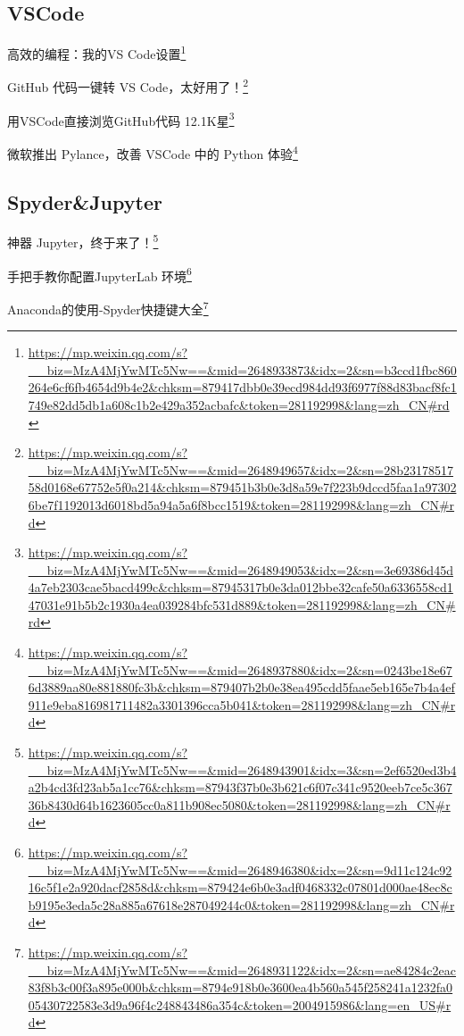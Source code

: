 \documentclass[]{ctexbook}
\renewcommand{\href}[2]{#2\footnote{\url{#1}}}
\begin{document}
\hypertarget{vscode}{%
\subsection{VSCode}\label{vscode}}

\href{https://mp.weixin.qq.com/s?__biz=MzA4MjYwMTc5Nw==\&mid=2648933873\&idx=2\&sn=b3ccd1fbc860264e6cf6fb4654d9b4e2\&chksm=879417dbb0e39ecd984dd93f6977f88d83bacf8fc1749e82dd5db1a608c1b2e429a352acbafc\&token=281192998\&lang=zh_CN\#rd}{高效的编程：我的VS Code设置}

\href{https://mp.weixin.qq.com/s?__biz=MzA4MjYwMTc5Nw==\&mid=2648949657\&idx=2\&sn=28b2317851758d0168e67752e5f0a214\&chksm=879451b3b0e3d8a59e7f223b9dccd5faa1a973026be7f1192013d6018bd5a94a5a6f8bcc1519\&token=281192998\&lang=zh_CN\#rd}{GitHub 代码一键转 VS Code，太好用了！}

\href{https://mp.weixin.qq.com/s?__biz=MzA4MjYwMTc5Nw==\&mid=2648949053\&idx=2\&sn=3e69386d45d4a7eb2303cae5bacd499c\&chksm=87945317b0e3da012bbe32cafe50a6336558cd147031e91b5b2c1930a4ea039284bfc531d889\&token=281192998\&lang=zh_CN\#rd}{用VSCode直接浏览GitHub代码 \textbar{} 12.1K星}

\href{https://mp.weixin.qq.com/s?__biz=MzA4MjYwMTc5Nw==\&mid=2648937880\&idx=2\&sn=0243be18e676d3889aa80e881880fc3b\&chksm=879407b2b0e38ea495cdd5faae5eb165e7b4a4ef911e9eba816981711482a3301396cca5b041\&token=281192998\&lang=zh_CN\#rd}{微软推出 Pylance，改善 VSCode 中的 Python 体验}

\hypertarget{spyderjupyter}{%
\subsection{Spyder\&Jupyter}\label{spyderjupyter}}

\href{https://mp.weixin.qq.com/s?__biz=MzA4MjYwMTc5Nw==\&mid=2648943901\&idx=3\&sn=2ef6520ed3b4a2b4cd3fd23ab5a1cc76\&chksm=87943f37b0e3b621c6f07c341c9520eeb7ce5c36736b8430d64b1623605cc0a811b908ec5080\&token=281192998\&lang=zh_CN\#rd}{神器 Jupyter，终于来了！}

\href{https://mp.weixin.qq.com/s?__biz=MzA4MjYwMTc5Nw==\&mid=2648946380\&idx=2\&sn=9d11c124c9216c5f1e2a920dacf2858d\&chksm=879424e6b0e3adf0468332c07801d000ae48ec8cb9195e3eda5c28a885a67618e287049244c0\&token=281192998\&lang=zh_CN\#rd}{手把手教你配置JupyterLab 环境}

\href{https://mp.weixin.qq.com/s?__biz=MzA4MjYwMTc5Nw==\&mid=2648931122\&idx=2\&sn=ae84284c2eac83f8b3c00f3a895e000b\&chksm=8794e918b0e3600ea4b560a545f258241a1232fa005430722583e3d9a96f4c248843486a354c\&token=2004915986\&lang=en_US\#rd}{Anaconda的使用-Spyder快捷键大全}
\end{document}
